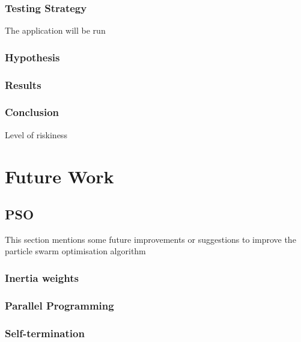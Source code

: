 \documentclass{pdfmx4020}
\begin{document}
    \subsection{Testing Strategy}
      The application will be run

    \subsection{Hypothesis}

    \subsection{Results}

    \subsection{Conclusion}

    Level of riskiness



\chapter{Future Work}

  \section{PSO} %
  \label{sec:pso}
  This section mentions some future improvements or suggestions to improve the particle swarm optimisation algorithm 
    \subsection{Inertia weights} %
    \label{sub:inertia_weights2}
    
    \subsection{Parallel Programming} %
    \label{sub:parallel_programming}
    
    \subsection{Self-termination} %
    \label{sub:self_termination}
    
\end{document}
